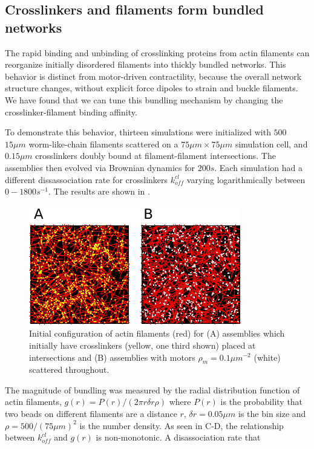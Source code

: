 \documentclass[12pt]{article} \usepackage{times} \usepackage{graphicx}
\begin{document}
\subsection{Crosslinkers and filaments form bundled networks} The rapid binding
and unbinding of crosslinking proteins from actin filaments can reorganize
initially disordered filaments into thickly bundled networks.  This behavior is
distinct from motor-driven contractility, because the overall network structure
changes, without explicit force dipoles to strain and buckle filaments. We have
found that we can tune this bundling mechanism by changing the
crosslinker-filament binding affinity.  \par To demonstrate this behavior,
thirteen simulations were initialized with $500$ $15\mu m$ worm-like-chain
filaments scattered on a $75\mu m\times 75\mu m$ simulation cell, and $0.15\mu
m$ crosslinkers doubly bound at filament-filament intersections.  The
assemblies then evolved via Brownian dynamics for $200s$.   Each simulation had
a different dissassociation rate for crosslinkers $k_{off}^{cl}$ varying
logarithmically between $0-1800 s^{-1}$.  The results are shown in
.  \par \begin{figure}[H] \centering
  \includegraphics[scale=1.2]{figs/t0.pdf} \caption{\label{fig:t0}Initial
  configuration of actin filaments (red) for (A) assemblies which initially
  have crosslinkers (yellow, one third shown) placed at intersections and (B)
  assemblies with motors $\rho_m=0.1\mu m^{-2}$ (white) scattered throughout.
} \end{figure} The magnitude of bundling was measured by the radial
distribution function of actin filaments, $g(r) = P(r)/(2\pi r \delta r\rho)$
where $P(r)$ is the probability that two beads on different filaments are a
distance $r$, $\delta r =0.05 \mu m$ is the bin size and $\rho = 500/(75\mu
m)^2$ is the number density. As seen in  C-D, the relationship
between $k_{off}^{cl}$ and $g(r)$ is non-monotonic. A disassociation rate that
\end{document}
